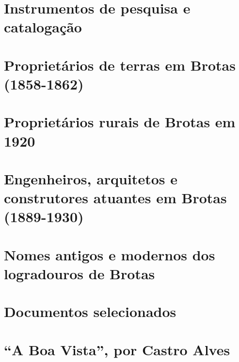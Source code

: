 \begin{anexosenv}

\partanexos
\label{cap:anexos}

\chapter{Instrumentos de pesquisa e catalogação}


\chapter{Proprietários de terras em Brotas (1858-1862)}\label{anexo1}


\chapter{Proprietários rurais de Brotas em 1920}


\chapter{Engenheiros, arquitetos e construtores atuantes em Brotas (1889-1930)}

\afterpage{
\begin{a3paisagem}

\end{a3paisagem}
}

\chapter{Nomes antigos e modernos dos logradouros de Brotas}


\chapter{Documentos selecionados}


\chapter{``A Boa Vista'', por Castro Alves}\label{cap:boavista}

\settowidth{\versewidth}{}


\end{anexosenv}
